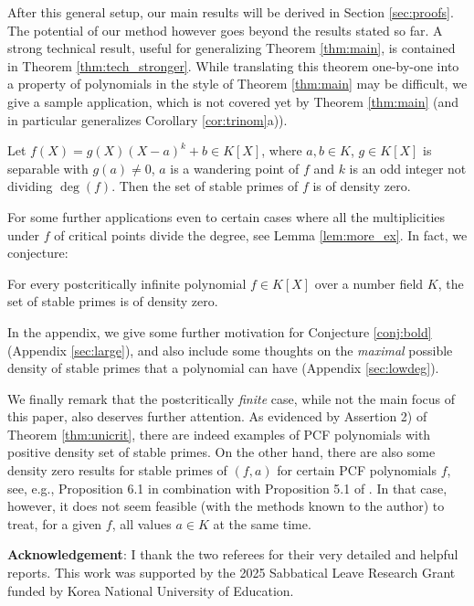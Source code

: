 \documentclass[a4paper]{amsart}
\begin{document}
  After this general setup, our main results will be derived in Section \ref{sec:proofs}.  
The potential of our method however goes beyond the results stated so far. A strong technical result, useful for generalizing Theorem \ref{thm:main}, is contained in Theorem \ref{thm:tech_stronger}. While translating this theorem one-by-one into a property of polynomials in the style of Theorem \ref{thm:main} may be difficult, we give a sample application, which is not covered yet by Theorem \ref{thm:main} (and in particular generalizes Corollary \ref{cor:trinom}a)).
\begin{theorem}
\label{thm:main_extra}
Let $f(X) = g(X)(X-a)^k+b \in K[X]$, where $a,b\in K$, $g\in K[X]$ is separable with $g(a)\ne 0$, $a$ is a wandering point of $f$ and $k$ is an odd integer not dividing $\deg(f)$. Then the set of stable primes of $f$ is of density zero.
\end{theorem}

  For some further applications even to certain cases where all the multiplicities under $f$ of critical points divide the degree, see Lemma \ref{lem:more_ex}. In fact, we conjecture:
  
  
  \begin{conjecture}
  \label{conj:bold}
  For every postcritically infinite polynomial $f\in K[X]$ over a number field $K$, the set of stable primes is of density zero.
  \end{conjecture}

  
In the appendix, we give some further motivation for Conjecture \ref{conj:bold} (Appendix \ref{sec:large}), and also include some thoughts on the {\it maximal} possible density of stable primes that a polynomial can have (Appendix \ref{sec:lowdeg}).
  
  We finally remark that the postcritically {\it finite} case, while not the main focus of this paper, also deserves further attention. As evidenced by Assertion 2) of Theorem \ref{thm:unicrit}, there are indeed examples of PCF polynomials with positive density set of stable primes. On the other hand, there are also some density zero results for stable primes of $(f,a)$ for certain PCF polynomials $f$, see, e.g., Proposition 6.1 in combination with Proposition 5.1 of \cite{KNR}. In that case, however, it does not seem feasible (with the methods known to the author) to treat, for a given $f$, all values $a\in K$ at the same time. 
  
  {\bf Acknowledgement}: I thank the two referees for their very detailed and helpful reports. This work was supported by the 2025 Sabbatical Leave Research Grant funded by Korea National University of Education.
  
\end{document}
